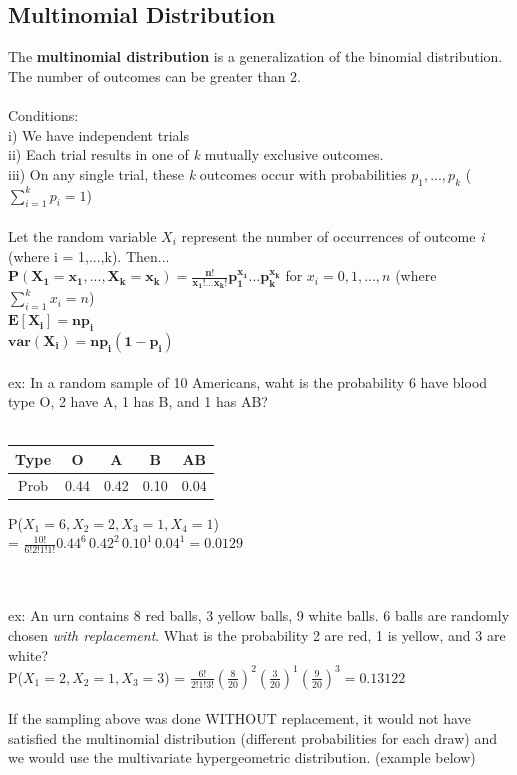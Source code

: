 \documentclass[12pt, a4paper]{article}
\begin{document}
	\subsection{Multinomial Distribution}
	The \textbf{multinomial distribution} is a generalization of the binomial distribution. The number of outcomes can be greater than 2. \\~\\
	Conditions: \\
	i) We have independent trials \\
	ii) Each trial results in one of \textit{k} mutually exclusive outcomes. \\
	iii) On any single trial, these \textit{k} outcomes occur with probabilities $p_1,...,p_k$ ($\sum_{i=1}^{k}p_i = 1$) \\~\\
	Let the random variable $X_i$ represent the number of occurrences of outcome \textit{i} (where i = 1,...,k). Then... \\
	$\mathbf{P(X_1 = x_1,...,X_k = x_k) = \frac{n!}{x_1!...x_k!}p_1^{x_1}...p_k^{x_k}}$ for $x_i = 0,1,...,n$ (where $\sum_{i=1}^{k}x_i = n$)\\
	$\mathbf{E[X_i] = np_i}$ \\
	$\mathbf{var(X_i) = np_i(1-p_i)}$\\~\\
	ex: In a random sample of 10 Americans, waht is the probability 6 have blood type O, 2 have A, 1 has B, and 1 has AB? \\~\\
	\begin{minipage}[c]{7cm}
		\begin{tabular}{ |c|c|c|c|c| } 
			\hline Type & O & A & B & AB \\ 
			\hline Prob & 0.44 & 0.42 & 0.10 & 0.04 \\ 
			\hline
		\end{tabular}
	\end{minipage}
	\begin{minipage}[c]{7cm}
		P($X_1 = 6, X_2 = 2, X_3 = 1, X_4 = 1$) \\
		= $\frac{10!}{6!2!1!1!}0.44^6\,0.42^2\,0.10^1\,0.04^1 =0.0129$
	\end{minipage} \\~\\
	
	\noindent ex: An urn contains 8 red balls, 3 yellow balls, 9 white balls. 6 balls are randomly chosen \textit{with replacement}. What is the probability 2 are red, 1 is yellow, and 3 are white? \\
	P($X_1 = 2, X_2 = 1, X_3 = 3$) = $\frac{6!}{2!1!3!}(\frac{8}{20})^2(\frac{3}{20})^1(\frac{9}{20})^3 = 0.13122$ \\~\\
	If the sampling above was done WITHOUT replacement, it would not have satisfied the multinomial distribution (different probabilities for each draw) and we would use the multivariate hypergeometric distribution. (example below)\\
	
\end{document}

